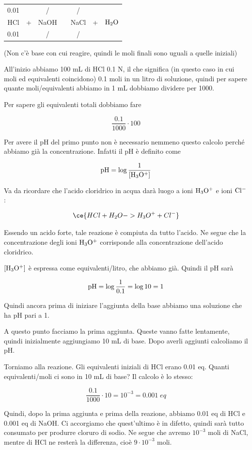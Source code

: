 \begin{center}
    \begin{tabular}{ccccccc}
        0.01 &  & / & & / & &\\
        HCl & + & NaOH & \ce{->} & NaCl & + & $\rm H_2O$\\
        0.01 &  &  / & & / & &\\
    \end{tabular}
\end{center}

(Non c'è base con cui reagire, quindi le moli finali sono uguali a quelle iniziali)

All'inizio abbiamo 100 mL di HCl 0.1 N, il che significa (in questo caso in cui moli ed equivalenti coincidono) 0.1 moli in un litro di soluzione, quindi per sapere quante moli/equivalenti abbiamo in 1 mL dobbiamo dividere per 1000.

Per sapere gli equivalenti totali dobbiamo fare

$$\frac{0.1}{1000} \cdot 100$$

Per avere il pH del primo punto non è necessario nemmeno questo calcolo perché abbiamo già la concentrazione. Infatti il pH è definito come

$$\rm pH=\log \frac{1}{[H_3O^+]}$$

Va da ricordare che l'acido cloridrico in acqua darà luogo a ioni $\rm H_3O^+$ e ioni $\rm Cl^-$:

$$\ce{HCl + H_2O -> H_3O^+ + Cl^-}$$

Essendo un acido forte, tale reazione è compiuta da tutto l'acido. Ne segue che la concentrazione degli ioni $\rm H_3O^+$ corrisponde alla concentrazione dell'acido cloridrico.

$\rm [H_3O^+]$ è espressa come equivalenti/litro, che abbiamo già. Quindi il pH sarà

$$\rm pH=\log\frac{1}{0.1}=\log10=1$$

Quindi ancora prima di iniziare l'aggiunta della base abbiamo una soluzione che ha pH pari a 1.

A questo punto facciamo la prima aggiunta. Queste vanno fatte lentamente, quindi inizialmente aggiungiamo 10 mL di base. Dopo averli aggiunti calcoliamo il pH.

Torniamo alla reazione. Gli equivalenti iniziali di HCl erano 0.01 eq. Quanti equivalenti/moli ci sono in 10 mL di base? Il calcolo è lo stesso:

$$\frac{0.1}{1000} \cdot 10=10^{-3}=0.001 \; eq$$

Quindi, dopo la prima aggiunta e prima della reazione, abbiamo 0.01 eq di HCl e 0.001 eq di NaOH. Ci accorgiamo che quest'ultimo è in difetto, quindi sarà tutto consumato per produrre cloruro di sodio. Ne segue che avremo $10^{-3}$ moli di NaCl, mentre di HCl ne resterà la differenza, cioè $9 \cdot 10^{-3}$ moli.


